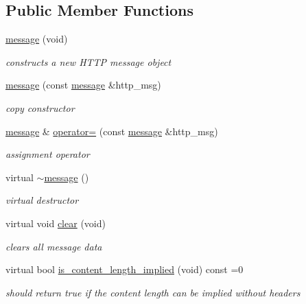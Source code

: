 \subsection*{Public Member Functions}
\begin{DoxyCompactItemize}
\item 
\hyperlink{classpion_1_1http_1_1message_ad07a7f30359b9f44c9159f3f9a9db507}{message} (void)
\begin{DoxyCompactList}\small\item\em constructs a new H\-T\-T\-P message object \end{DoxyCompactList}\item 
\hyperlink{classpion_1_1http_1_1message_a576e849f9d4a138d4856c83ceb0c47a3}{message} (const \hyperlink{classpion_1_1http_1_1message}{message} \&http\-\_\-msg)
\begin{DoxyCompactList}\small\item\em copy constructor \end{DoxyCompactList}\item 
\hyperlink{classpion_1_1http_1_1message}{message} \& \hyperlink{classpion_1_1http_1_1message_a854b089e577498c9b01e5ec460595a35}{operator=} (const \hyperlink{classpion_1_1http_1_1message}{message} \&http\-\_\-msg)
\begin{DoxyCompactList}\small\item\em assignment operator \end{DoxyCompactList}\item 
virtual \hyperlink{classpion_1_1http_1_1message_ac71ae21f149f7d74b2bdee1bf1149ead}{$\sim$message} ()
\begin{DoxyCompactList}\small\item\em virtual destructor \end{DoxyCompactList}\item 
virtual void \hyperlink{classpion_1_1http_1_1message_af13279269cf1e00ae4fc5091c1c7cae5}{clear} (void)
\begin{DoxyCompactList}\small\item\em clears all message data \end{DoxyCompactList}\item 
virtual bool \hyperlink{classpion_1_1http_1_1message_a08bd257bd46e7a42b64bbc4482f28363}{is\-\_\-content\-\_\-length\-\_\-implied} (void) const =0
\begin{DoxyCompactList}\small\item\em should return true if the content length can be implied without headers \end{DoxyCompactList}\item 

\end{DoxyCompactItemize}
